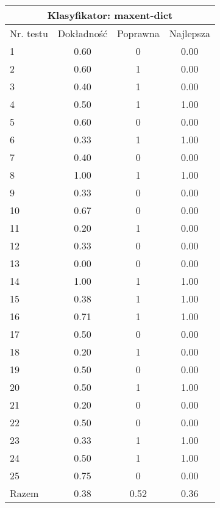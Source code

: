 \begin{tabular}{|l|c|c|c|}
\hline
\multicolumn{4}{|c|}{Klasyfikator: maxent-dict}\\
\hline
Nr. testu & Dokładność & Poprawna & Najlepsza\\
\hline
1 & 0.60 & 0 & 0.00 \\
2 & 0.60 & 1 & 0.00 \\
3 & 0.40 & 1 & 0.00 \\
4 & 0.50 & 1 & 1.00 \\
5 & 0.60 & 0 & 0.00 \\
6 & 0.33 & 1 & 1.00 \\
7 & 0.40 & 0 & 0.00 \\
8 & 1.00 & 1 & 1.00 \\
9 & 0.33 & 0 & 0.00 \\
10 & 0.67 & 0 & 0.00 \\
11 & 0.20 & 1 & 0.00 \\
12 & 0.33 & 0 & 0.00 \\
13 & 0.00 & 0 & 0.00 \\
14 & 1.00 & 1 & 1.00 \\
15 & 0.38 & 1 & 1.00 \\
16 & 0.71 & 1 & 1.00 \\
17 & 0.50 & 0 & 0.00 \\
18 & 0.20 & 1 & 0.00 \\
19 & 0.50 & 0 & 0.00 \\
20 & 0.50 & 1 & 1.00 \\
21 & 0.20 & 0 & 0.00 \\
22 & 0.50 & 0 & 0.00 \\
23 & 0.33 & 1 & 1.00 \\
24 & 0.50 & 1 & 1.00 \\
25 & 0.75 & 0 & 0.00 \\
\hline
Razem & 0.38 & 0.52 & 0.36 \\
\hline
\end{tabular}
